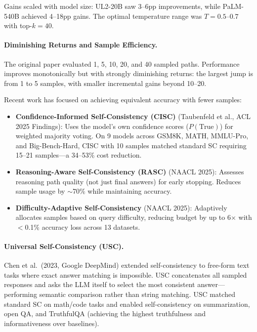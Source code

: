 \documentclass[11pt,a4paper]{article}
\begin{document}
Gains scaled with model size: UL2-20B saw 3--6pp improvements, while PaLM-540B achieved 4--18pp gains.
The optimal temperature range was $T=0.5$--$0.7$ with top-$k=40$.

\paragraph{Diminishing Returns and Sample Efficiency.}
The original paper evaluated 1, 5, 10, 20, and 40 sampled paths.
Performance improves monotonically but with strongly diminishing returns: the largest jump is from 1 to 5 samples, with smaller incremental gains beyond 10--20.

Recent work has focused on achieving equivalent accuracy with fewer samples:

\begin{itemize}
    \item \textbf{Confidence-Informed Self-Consistency (CISC)} (Taubenfeld et al., ACL 2025 Findings): Uses the model's own confidence scores ($P(\text{True})$) for weighted majority voting. On 9 models across GSM8K, MATH, MMLU-Pro, and Big-Bench-Hard, CISC with 10 samples matched standard SC requiring 15--21 samples---a 34--53\% cost reduction.

    \item \textbf{Reasoning-Aware Self-Consistency (RASC)} (NAACL 2025): Assesses reasoning path quality (not just final answers) for early stopping. Reduces sample usage by $\sim$70\% while maintaining accuracy.

    \item \textbf{Difficulty-Adaptive Self-Consistency} (NAACL 2025): Adaptively allocates samples based on query difficulty, reducing budget by up to 6$\times$ with $<$0.1\% accuracy loss across 13 datasets.
\end{itemize}

\paragraph{Universal Self-Consistency (USC).}
Chen et al.\ (2023, Google DeepMind) extended self-consistency to free-form text tasks where exact answer matching is impossible.
USC concatenates all sampled responses and asks the LLM itself to select the most consistent answer---performing semantic comparison rather than string matching.
USC matched standard SC on math/code tasks and enabled self-consistency on summarization, open QA, and TruthfulQA (achieving the highest truthfulness and informativeness over baselines).
\end{document}
